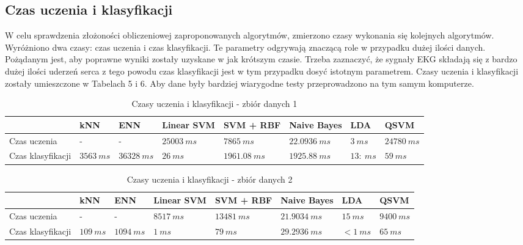 \documentclass[[10pt,a4paper]{article}
\begin{document}
\subsection{Czas uczenia i klasyfikacji}

W celu sprawdzenia złożoności obliczeniowej zaproponowanych algorytmów, zmierzono czasy wykonania się kolejnych algorytmów. Wyróżniono dwa czasy: czas uczenia i czas klasyfikacji. Te parametry odgrywają znaczącą role w przypadku dużej ilości danych. Pożądanym jest, aby poprawne wyniki zostały uzyskane w jak krótszym czasie. Trzeba zaznaczyć, że sygnały EKG składają się z bardzo dużej ilości uderzeń serca z tego  powodu czas klasyfikacji jest w tym przypadku dosyć istotnym parametrem. Czasy uczenia i klasyfikacji zostały umieszczone w Tabelach 5 i 6. Aby dane były bardziej wiarygodne testy przeprowadzono na tym samym komputerze. 

\begin{table}[h]
\centering
\caption{Czasy uczenia i klasyfikacji  - zbiór danych 1}
\label{timesTable2}
\begin{tabular}{l|l|l|l|l|l|l|l|}
\cline{2-7}
                                        & kNN & ENN & Linear SVM & SVM + RBF & Naive Bayes & LDA & QSVM \\ \hline
\multicolumn{1}{|l|}{Czas uczenia}      &  -  &  -   &  $25003\: ms$   &   $7865\: ms$   &   $22.0936 \: ms$ & $3\: ms$  & $24 780\: ms$  \\ \hline
\multicolumn{1}{|l|}{Czas klasyfikacji} &  $3563 \: ms$&   $36328\: ms$   &   $26\: ms$  &      $1961.08\: ms$&     $1925.88\: ms$        & $13 :\ ms$ &$59\:ms$ \\ \hline
\end{tabular}
\end{table}

\begin{table}[h]
\centering
\caption{Czasy uczenia i klasyfikacji - zbiór danych 2}
\label{timesTable1}
\begin{tabular}{l|l|l|l|l|l|l|l|}
\cline{2-7}
                                        & kNN & ENN & Linear SVM & SVM + RBF & Naive Bayes & LDA &QSVM \\ \hline
\multicolumn{1}{|l|}{Czas uczenia}      &  -  &  -   &  $8517\: ms$   &   $13481\: ms$   &   $21.9034\: ms$ & $15\: ms$  & $9400\:ms$  \\ \hline
\multicolumn{1}{|l|}{Czas klasyfikacji} &  $109 \: ms$   &   $1094\: ms$   &   $1\: ms$  &      $79\: ms$     &     $29.2936\: ms$        & $< 1\: ms$ & $65\:ms$ \\ \hline
\end{tabular}
\end{table}
\end{document}
